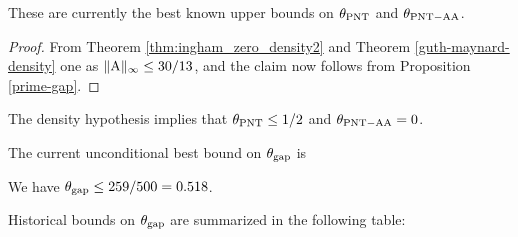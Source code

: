 These are currently the best known upper bounds on $\theta_{\mathrm{PNT}}$ and $\theta_{\mathrm{PNT-AA}}$.

\begin{proof}  From Theorem \ref{thm:ingham_zero_density2} and Theorem \ref{guth-maynard-density} one as $\|\mathrm{A}\|_\infty \leq 30/13$, and the claim now follows from Proposition \ref{prime-gap}.
\end{proof}

\begin{corollary}  The density hypothesis implies that $\theta_{\mathrm{PNT}} \leq 1/2$ and $\theta_{\mathrm{PNT-AA}} = 0$.
\end{corollary}

The current unconditional best bound on $\theta_{\mathrm{gap}}$ is

\begin{theorem}\cite{lu_yuan_primes_2025}\label{bhp-thm} We have $\theta_{\mathrm{gap}} \leq 259/500 = 0.518$.
\end{theorem}

Historical bounds on $\theta_{\mathrm{gap}}$ are summarized in the following table:

